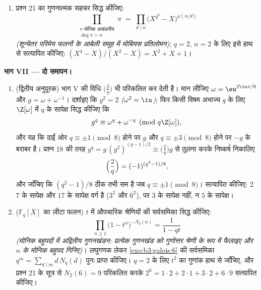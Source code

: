 \begin{problem}
\begin{enumerate}[resume]
        मोनिक बहुपद $\sim \frac1n$ प्रायिकता से  होता है --- यह
        अभाज्य संख्या प्रमेय का सटीक समरूप है, जिसमें $\log x$ के
        स्थान पर $n$ आ गया है; $q = 2$, $n \leq 4$ के लिए
        संख्यात्मक सत्यापन कीजिए (\cref{exo:b3:galois:6} में गणनाएँ दी हैं)।
  \item प्रश्न 21 का गुणनात्मक सहचर सिद्ध कीजिए:
        \[
        \prod_{\substack{\pi \text{ मोनिक अखंडनीय}\\ \deg\pi =
        n}}\pi \;=\; \prod_{d \mid n}
        \bigl(X^{q^d} - X\bigr)^{\mu(n/d)}
        \]
        \emph{(शून्येतर परिमेय फलनों के आबेली समूह में मोबियस
        प्रतिलोमन)}; $q
        = 2$, $n = 2$ के लिए इसे हाथ से सत्यापित
        कीजिए: $(X^4 - X)/(X^2 - X) = X^2 + X + 1$।
\end{enumerate}

\medskip
\noindent\textbf{भाग VII --- दो समापन।}
\begin{enumerate}[resume]
  \item (द्वितीय अनुपूरक) भाग V की विधि $\bigl(\frac2q\bigr)$ भी परिकलित कर देती
        है। मान लीजिए $\omega = \eu^{2\iu\pi/8}$ और $g = \omega + \omega^{-1}$। दर्शाइए कि $g^2 = 2$
        \emph{($\omega^2 = \iu$)}; फिर किसी विषम अभाज्य $q$ के लिए
        $\Z[\omega]$ में $q$ के सापेक्ष सिद्ध कीजिए कि
        \[
        g^q \equiv \omega^q + \omega^{-q} \pmod{q\Z[\omega]},
        \]
        और यह कि दाईं ओर $q \equiv \pm1
        \pmod 8$ होने पर $g$ और $q \equiv \pm3 \pmod 8$ होने पर
        $-g$ के बराबर है। प्रश्न 18 की तरह $g^q = g\,(g^2)^{(q-1)/2} \equiv
        \bigl(\frac2q\bigr)g$ से तुलना करके
        निष्कर्ष निकालिए
        \[
        \Bigl(\frac2q\Bigr) = (-1)^{(q^2-1)/8},
        \]
        और जाँचिए कि $(q^2 - 1)/8$ ठीक तभी सम है जब $q
        \equiv \pm1 \pmod 8$। सत्यापित
        कीजिए: $2$ $7$ के सापेक्ष और $17$ के सापेक्ष
        वर्ग है ($3^2$ और $6^2$), पर $3$ के सापेक्ष नहीं,
        न $5$ के सापेक्ष।
  \item ($\mathbb F_q[X]$ का ज़ीटा फलन) $t$ में औपचारिक  श्रेणियों की
        सर्वसमिका सिद्ध कीजिए:
        \[
        \prod_{n \geq 1}\bigl(1 - t^n\bigr)^{-N_q(n)}
        = \frac1{1 - qt}
        \]
        \emph{(मोनिक  बहुपदों में अद्वितीय गुणनखंडन:
        प्रत्येक गुणनखंड को गुणोत्तर श्रेणी के रूप में फैलाइए और
         $n$ के मोनिक बहुपद गिनिए)}। लघुगणक लेकर \cref{exo:b3:galois:6} की
        सर्वसमिका $q^m = \sum_{d \mid m}d\,N_q(d)$ पुनः प्राप्त कीजिए। $q = 2$ के लिए
        $t^2$ का गुणांक हाथ से जाँचिए, और प्रश्न 21 के सूत्र से
        $N_2(6) = 9$ परिकलित करके $2^6 = 1\cdot2 + 2\cdot1 + 3\cdot2 +
        6\cdot9$ सत्यापित कीजिए।
\end{enumerate}
\end{problem}
